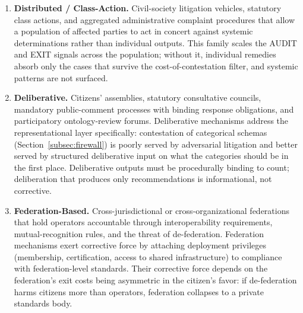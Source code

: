 \documentclass{article}
\theoremstyle{definition}
\begin{document}
\begin{enumerate}[noitemsep]
    \item \textbf{Distributed / Class-Action.} Civil-society litigation vehicles, statutory class actions, and aggregated administrative complaint procedures that allow a population of affected parties to act in concert against systemic determinations rather than individual outputs. This family scales the AUDIT and EXIT signals across the population; without it, individual remedies absorb only the cases that survive the cost-of-contestation filter, and systemic patterns are not surfaced.

    \item \textbf{Deliberative.} Citizens' assemblies, statutory consultative councils, mandatory public-comment processes with binding response obligations, and participatory ontology-review forums. Deliberative mechanisms address the representational layer specifically: contestation of categorical schemas (Section~\ref{subsec:firewall}) is poorly served by adversarial litigation and better served by structured deliberative input on what the categories should be in the first place. Deliberative outputs must be procedurally binding to count; deliberation that produces only recommendations is informational, not corrective.

    \item \textbf{Federation-Based.} Cross-jurisdictional or cross-organizational federations that hold operators accountable through interoperability requirements, mutual-recognition rules, and the threat of de-federation. Federation mechanisms exert corrective force by attaching deployment privileges (membership, certification, access to shared infrastructure) to compliance with federation-level standards. Their corrective force depends on the federation's exit costs being asymmetric in the citizen's favor: if de-federation harms citizens more than operators, federation collapses to a private standards body.
\end{enumerate}
\end{document}
